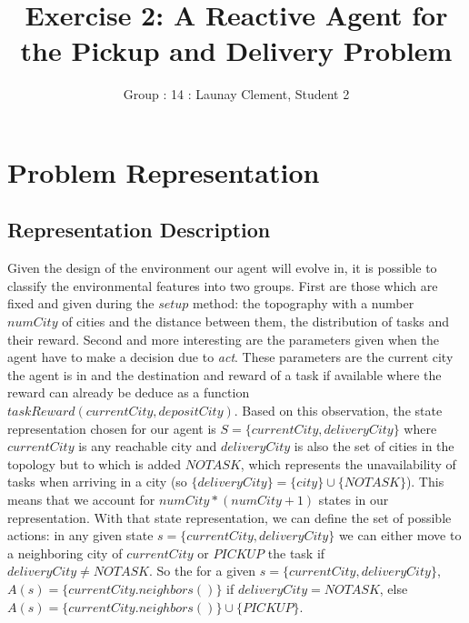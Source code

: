 \documentclass[11pt]{article}
\title{\bf Exercise 2: A Reactive Agent for the Pickup and Delivery Problem}
\author{Group \textnumero: 14 : Launay Clement, Student 2}
\begin{document}
\maketitle

\section{Problem Representation}

\subsection{Representation Description}

Given the design of the environment our agent will evolve in, it is possible to classify the environmental features into two groups.
First are those which are fixed and given during the $setup$ method: the topography with a number $numCity$ of cities and the distance between them, the distribution of tasks and their reward.
Second and more interesting are the parameters given when the agent have to make a decision due to \textit{act}. These parameters are the current city the agent is in and the destination and reward of a task if available where the reward can already be deduce as a function $taskReward(currentCity,depositCity)$.
Based on this observation, the state representation chosen for our agent is $S=\{currentCity,deliveryCity\}$ where $currentCity$ is any reachable city and $deliveryCity$ is also the set of cities in the topology but to which is added $NOTASK$, which represents the unavailability of tasks when arriving in a city (so $\{deliveryCity\}=\{city\} \cup \{NOTASK\}$). This means that we account for $numCity*(numCity+1)$ states in our representation.
With that state representation, we can define the set of possible actions: in any given state $s=\{currentCity,deliveryCity\}$ we can either move to a neighboring city of $currentCity$ or $PICKUP$ the task if $deliveryCity \neq NOTASK$.
\newline
So the for a given $s=\{currentCity,deliveryCity\}$, $A(s)=\{currentCity.neighbors()\}$ if $deliveryCity = NOTASK$, else $A(s)=\{currentCity.neighbors()\} \cup \{PICKUP\}$. 
\end{document}
